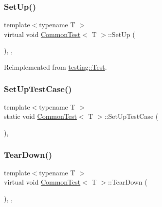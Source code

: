 \subsubsection{\texorpdfstring{SetUp()}{SetUp()}}
{\footnotesize\ttfamily template$<$typename T $>$ \\
virtual void \mbox{\hyperlink{classCommonTest}{Common\+Test}}$<$ T $>$\+::Set\+Up (\begin{DoxyParamCaption}{ }\end{DoxyParamCaption})\hspace{0.3cm}{\ttfamily [inline]}, {\ttfamily [protected]}, {\ttfamily [virtual]}}



Reimplemented from \mbox{\hyperlink{classtesting_1_1Test_a190315150c303ddf801313fd1a777733}{testing\+::\+Test}}.

\mbox{\label{classCommonTest_a6edd90f32f45cc49e4a423b22bd770ce}} 
\subsubsection{\texorpdfstring{SetUpTestCase()}{SetUpTestCase()}}
{\footnotesize\ttfamily template$<$typename T $>$ \\
static void \mbox{\hyperlink{classCommonTest}{Common\+Test}}$<$ T $>$\+::Set\+Up\+Test\+Case (\begin{DoxyParamCaption}{ }\end{DoxyParamCaption})\hspace{0.3cm}{\ttfamily [inline]}, {\ttfamily [static]}}

\mbox{\label{classCommonTest_aeae195c2cefa956c6ae5be1226e6ecd8}} 
\subsubsection{\texorpdfstring{TearDown()}{TearDown()}}
{\footnotesize\ttfamily template$<$typename T $>$ \\
virtual void \mbox{\hyperlink{classCommonTest}{Common\+Test}}$<$ T $>$\+::Tear\+Down (\begin{DoxyParamCaption}{ }\end{DoxyParamCaption})\hspace{0.3cm}{\ttfamily [inline]}, {\ttfamily [protected]}, {\ttfamily [virtual]}}



